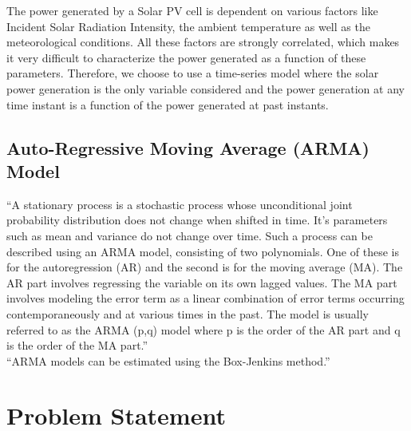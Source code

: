\documentclass[journal]{IEEEtran}
\begin{document}
The power generated by a Solar PV cell is dependent on various factors like Incident Solar Radiation Intensity, the ambient temperature as well as the meteorological conditions. All these factors are strongly correlated, which makes it very difficult to characterize the power generated as a function of these parameters. \cite{zhou2007novel} Therefore, we choose to use a time-series model where the solar power generation is the only variable considered and the power generation at any time instant is a function of the power generated at past instants. \cite{huang2012solar}

\subsection{Auto-Regressive Moving Average (ARMA) Model}

“A stationary process is a stochastic process whose unconditional joint probability distribution does not change when shifted in time. It’s parameters such as mean and variance do not change over time. Such a process can be described using an ARMA model, consisting of two polynomials. One of these is for the autoregression (AR) and the second is for the moving average (MA). The AR part involves regressing the variable on its own lagged values. The MA part involves modeling the error term as a linear combination of error terms occurring contemporaneously and at various times in the past. The model is usually referred to as the ARMA (p,q) model where p is the order of the AR part and q is the order of the MA part.”
\\
“ARMA models can be estimated using the Box-Jenkins method.” \cite{box2015time} \cite{baillie2017maximum} \cite{sandgren2012moving}
\\


\section{Problem Statement}
\end{document}
